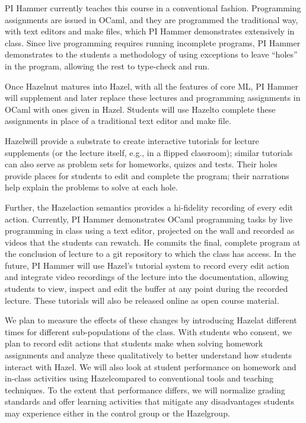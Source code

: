 \documentclass[letterpaper,USenglish]{lipics-v2016}
\newcommand{\Hazel}[0]{\textsf{Hazel}}
\begin{document}
PI Hammer currently teaches this course in a conventional fashion.
%
Programming assignments are issued in OCaml, and they are programmed
the traditional way, with text editors and make files, which PI Hammer
demonstrates extensively in class.
%
Since live programming requires running incomplete programs, PI Hammer
demonstrates to the students a methodology of using exceptions to
leave ``holes'' in the program, allowing the rest to type-check and
run.

Once Hazelnut matures into \Hazel, with all the features of core ML,
PI Hammer will supplement and later replace these lectures and
programming assignments in OCaml with ones given in \Hazel.
%
Students will use \Hazel to complete these assignments in place of a
traditional text editor and make file.

\Hazel will provide a
substrate to create interactive tutorials for lecture supplements (or
the lecture itself, e.g., in a flipped classroom); similar tutorials
can also serve as problem sets for homeworks, quizes and tests.
%
Their holes provide places for students to edit and complete the
program; their narrations help explain the problems to solve at each
hole.

Further, the \Hazel action semantics provides a hi-fidelity recording
of every edit action. Currently, PI Hammer demonstrates OCaml
programming tasks by live programming in class using a text editor,
projected on the wall and recorded as videos that the students can
rewatch.  He commits the final, complete program at the conclusion of
lecture to a git repository to which the class has access.
%
In the future, PI Hammer will use \Hazel's tutorial system to record every edit action
and integrate video recordings of the lecture into the documentation,
allowing students to view, inspect and edit the buffer at any point
during the recorded lecture. These tutorials will also be released online as 
open course material. 

We plan to measure the effects of these changes by introducing \Hazel at
different times for different sub-populations of the class.  With
students who consent, we plan to record edit actions that students
make when solving homework assignments and analyze these qualitatively
to better understand how students interact with \Hazel.  We will also
look at student performance on homework and in-class activities using
\Hazel compared to conventional tools and teaching techniques.  To the
extent that performance differs, we will normalize grading standards and
offer learning activities that mitigate any disadvantages students may
experience either in the control group or the \Hazel group.
%
\end{document}
